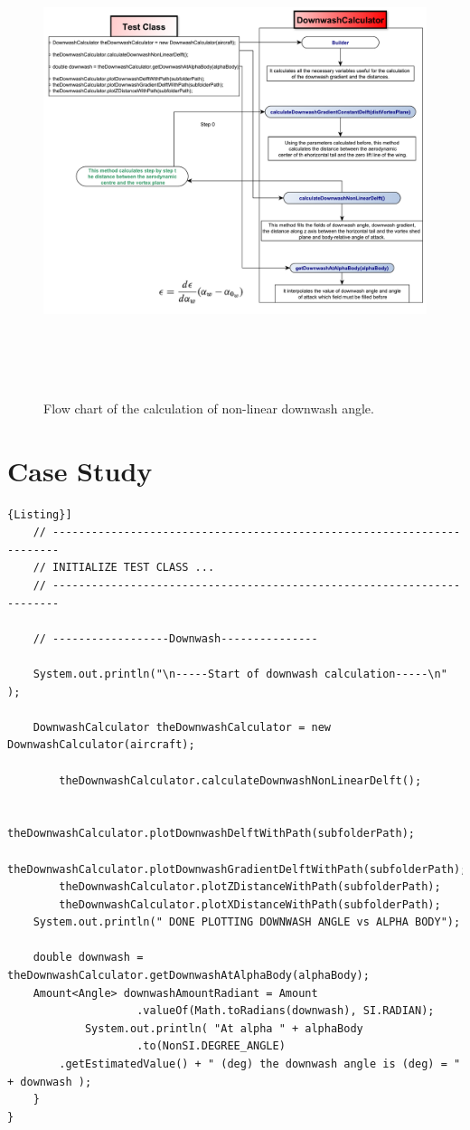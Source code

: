 \begin{figure}[H]
\centering
{\includegraphics[height=13cm]{Immagini/nonlinear_2.pdf}} 
\caption{Flow chart of the calculation of non-linear downwash angle.}
\label{flowchartangles}
\end{figure} 


\section{Case Study}


\begin{lstlisting}[frame=rbl,caption={{\footnotesize Downwash Test Class}},label= [style=\bfseries]{Listing}]
	// -----------------------------------------------------------------------
	// INITIALIZE TEST CLASS ...
	// -----------------------------------------------------------------------

	// ------------------Downwash---------------

	System.out.println("\n-----Start of downwash calculation-----\n" );

	DownwashCalculator theDownwashCalculator = new DownwashCalculator(aircraft);
	
		theDownwashCalculator.calculateDownwashNonLinearDelft();
		
		theDownwashCalculator.plotDownwashDelftWithPath(subfolderPath);
		theDownwashCalculator.plotDownwashGradientDelftWithPath(subfolderPath);
		theDownwashCalculator.plotZDistanceWithPath(subfolderPath);
		theDownwashCalculator.plotXDistanceWithPath(subfolderPath);
	System.out.println(" DONE PLOTTING DOWNWASH ANGLE vs ALPHA BODY");

	double downwash = theDownwashCalculator.getDownwashAtAlphaBody(alphaBody);
	Amount<Angle> downwashAmountRadiant = Amount
					.valueOf(Math.toRadians(downwash), SI.RADIAN);
			System.out.println( "At alpha " + alphaBody
					.to(NonSI.DEGREE_ANGLE)
		.getEstimatedValue() + " (deg) the downwash angle is (deg) = " + downwash );
	}
}
\end{lstlisting}

